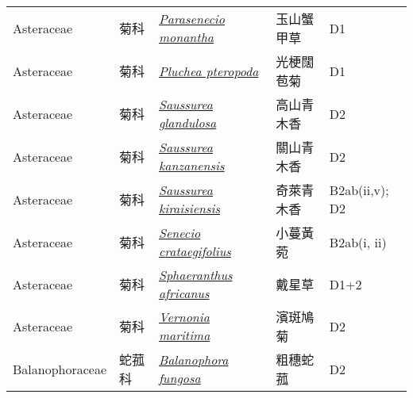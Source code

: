 {\begin{longtable}{L{2.5cm}L{2cm}L{5cm}L{2.5cm}L{3cm}}
    Asteraceae & 菊科 & \href{http://www.theplantlist.org/tpl1.1/search?q=Parasenecio+monantha}{\textit{Parasenecio monantha} } & 玉山蟹甲草 & D1    \\
    Asteraceae & 菊科 & \href{http://www.theplantlist.org/tpl1.1/search?q=Pluchea+pteropoda}{\textit{Pluchea pteropoda} } & 光梗闊苞菊 & D1    \\
    Asteraceae & 菊科 & \href{http://www.theplantlist.org/tpl1.1/search?q=Saussurea+glandulosa}{\textit{Saussurea glandulosa} } & 高山青木香 & D2    \\
    Asteraceae & 菊科 & \href{http://www.theplantlist.org/tpl1.1/search?q=Saussurea+kanzanensis}{\textit{Saussurea kanzanensis} } & 關山青木香 & D2    \\
    Asteraceae & 菊科 & \href{http://www.theplantlist.org/tpl1.1/search?q=Saussurea+kiraisiensis}{\textit{Saussurea kiraisiensis} } & 奇萊青木香 & B2ab(ii,v); D2    \\
    Asteraceae & 菊科 & \href{http://www.theplantlist.org/tpl1.1/search?q=Senecio+crataegifolius}{\textit{Senecio crataegifolius} } & 小蔓黃菀 & B2ab(i, ii)    \\
    Asteraceae & 菊科 & \href{http://www.theplantlist.org/tpl1.1/search?q=Sphaeranthus+africanus}{\textit{Sphaeranthus africanus} } & 戴星草 & D1+2    \\
    Asteraceae & 菊科 & \href{http://www.theplantlist.org/tpl1.1/search?q=Vernonia+maritima}{\textit{Vernonia maritima} } & 濱斑鳩菊 & D2    \\
    Balanophoraceae & 蛇菰科 & \href{http://www.theplantlist.org/tpl1.1/search?q=Balanophora+fungosa}{\textit{Balanophora fungosa} } & 粗穗蛇菰 & D2    \\

\end{longtable}}

